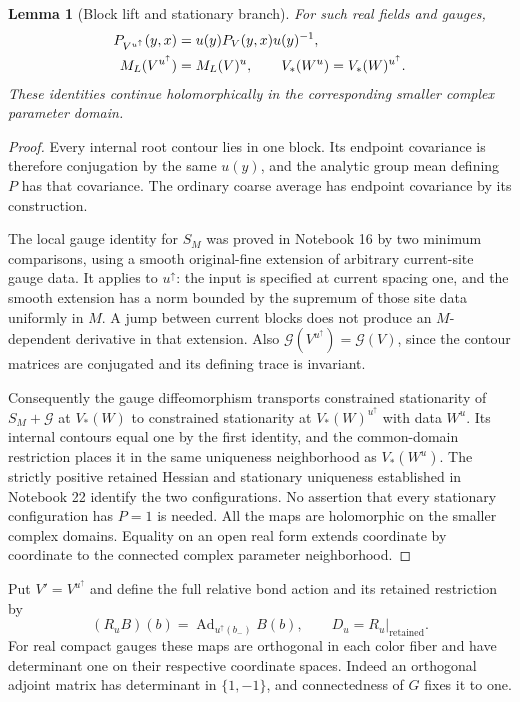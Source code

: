 \documentclass[11pt]{article}
\newtheorem{lemma}[theorem]{Lemma}
\theoremstyle{remark}
\begin{document}
\begin{lemma}[Block lift and stationary branch]\label{gc-branch-lemma}
For such real fields and gauges,
\begin{align}
 P_{V^{u^\uparrow}}(y,x)&=u(y)P_V(y,x)u(y)^{-1},\notag\\
 M_L(V^{u^\uparrow})&=M_L(V)^u,\qquad
 V_*(W^u)=V_*(W)^{u^\uparrow}.                           \label{gc-branch-equivariance}
\end{align}
These identities continue holomorphically in the corresponding
smaller complex parameter domain.
\end{lemma}
\begin{proof}
Every internal root contour lies in one block. Its endpoint
covariance is therefore conjugation by the same $u(y)$, and the
analytic group mean defining $P$ has that covariance. The ordinary
coarse average has endpoint covariance by its construction.

The local gauge identity for $S_M$ was proved in Notebook 16 by two
minimum comparisons, using a smooth original-fine extension of
arbitrary current-site gauge data. It applies to $u^\uparrow$:
the input is specified at current spacing one, and the smooth
extension has a norm bounded by the supremum of those site data
uniformly in $M$. A jump between current blocks does not produce
an $M$-dependent derivative in that extension.
Also $\mathscr G(V^{u^\uparrow})=\mathscr G(V)$, since the
contour matrices are conjugated and its defining trace is invariant.

Consequently the gauge diffeomorphism transports constrained
stationarity of $S_M+\mathscr G$ at $V_*(W)$ to constrained
stationarity at $V_*(W)^{u^\uparrow}$ with data $W^u$.
Its internal contours equal one by the first identity, and the
common-domain restriction places it in the same uniqueness
neighborhood as $V_*(W^u)$. The strictly positive retained Hessian
and stationary uniqueness established in Notebook 22 identify
the two configurations. No assertion that every stationary
configuration has $P=1$ is needed.
All the maps are holomorphic on the smaller complex domains.
Equality on an open real form extends coordinate by coordinate
to the connected complex parameter neighborhood.
\end{proof}

Put $V'=V^{u^\uparrow}$ and define the full relative bond action
and its retained restriction by
\begin{equation}\label{gc-adjoint-maps}
 (R_u B)(b)=\operatorname{Ad}_{u^\uparrow(b_-)}B(b),
 \qquad D_u=R_u|_{\mathrm{retained}}.
\end{equation}
For real compact gauges these maps are orthogonal in each color
fiber and have determinant one on their respective coordinate
spaces. Indeed an orthogonal adjoint matrix has determinant in
$\{1,-1\}$, and connectedness of $G$ fixes it to one.
\end{document}
